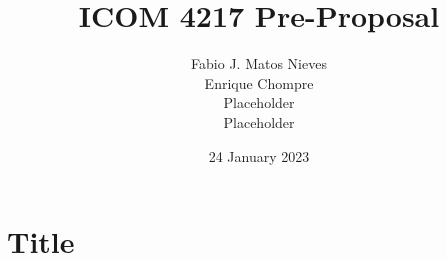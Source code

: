 \documentclass[12pt]{report}
\title{ICOM 4217 Pre-Proposal}
\author{Fabio J. Matos Nieves\\
  Enrique Chompre\\
  Placeholder\\
  Placeholder
}
\date{24 January 2023}
\begin{document}
\maketitle
\tableofcontents
\section{Title}
\end{document}
